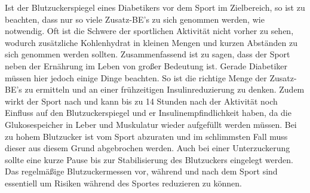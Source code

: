 \documentclass[a4paper,11pt]{article}%
\renewcommand{\\}{\vspace*{0.5\baselineskip} \newline}
\begin{document}
	Ist der Blutzuckerspiegel eines Diabetikers vor dem Sport im Zielbereich, so ist zu beachten, dass nur so viele Zusatz-BE’s zu sich genommen werden, wie notwendig. Oft ist die Schwere der sportlichen Aktivität nicht vorher zu sehen, wodurch zusätzliche Kohlenhydrat in kleinen Mengen und kurzen Abständen zu sich genommen werden sollten.\cite{SG}\\
	Zusammenfassend ist zu sagen, dass der Sport neben der Ernährung im Leben von großer Bedeutung ist. Gerade Diabetiker müssen hier jedoch einige Dinge beachten. So ist die richtige Menge der Zusatz-BE’s zu ermitteln und an einer frühzeitigen Insulinreduzierung zu denken. Zudem wirkt der Sport nach und kann bis zu 14 Stunden nach der Aktivität noch Einfluss auf den Blutzuckerspiegel und er Insulinempfindlichkeit haben, da die Glukosespeicher in Leber und Muskulatur wieder aufgefüllt werden müssen. Bei zu hohem Blutzucker ist vom Sport abzuraten und im schlimmsten Fall muss dieser aus diesem Grund abgebrochen werden. Auch bei einer Unterzuckerung sollte eine kurze Pause bis zur Stabilisierung des Blutzuckers eingelegt werden. Das regelmäßige Blutzuckermessen vor, während und nach dem Sport sind essentiell um Risiken während des Sportes reduzieren zu können.\cite{SG}
\end{document}
